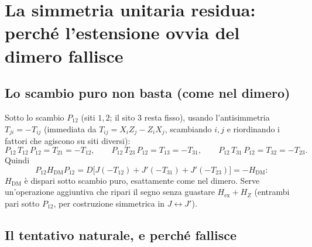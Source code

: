 \documentclass[11pt,a4paper]{article}
\begin{document}
\section{La simmetria unitaria residua: perché l'estensione ovvia del dimero fallisce}
\label{sec:simmetria-U}

\subsection{Lo scambio puro non basta (come nel dimero)}

Sotto lo scambio $P_{12}$ (siti $1,2$; il sito $3$ resta fisso), usando l'antisimmetria
$T_{ji}=-T_{ij}$ (immediata da $T_{ij}=X_iZ_j-Z_iX_j$, scambiando $i,j$ e riordinando i fattori
che agiscono su siti diversi):
\begin{equation}
P_{12}\,T_{12}\,P_{12} = T_{21}=-T_{12},\qquad
P_{12}\,T_{23}\,P_{12} = T_{13}=-T_{31},\qquad
P_{12}\,T_{31}\,P_{12} = T_{32}=-T_{23}.
\end{equation}
Quindi
$$P_{12}H_{\mathrm{DM}}P_{12}=D\big[J(-T_{12})+J'(-T_{31})+J'(-T_{23})\big]=-H_{\mathrm{DM}}:$$
$H_{\mathrm{DM}}$ è dispari sotto scambio puro, esattamente come nel dimero. Serve
un'operazione aggiuntiva che ripari il segno senza guastare $H_{\mathrm{ex}}+H_Z$ (entrambi pari
sotto $P_{12}$, per costruzione simmetrica in $J\leftrightarrow J'$).

\subsection{Il tentativo naturale, e perché fallisce}
\label{sec:tentativo-fallito}
\end{document}
